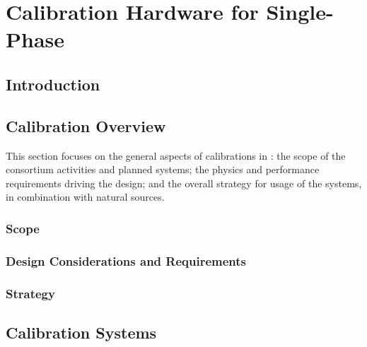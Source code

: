 

\chapter{Calibration Hardware for Single-Phase}
\label{ch:sp-calib}

\section{Introduction}
\label{sec:sp-calib-intro}



\section{Calibration Overview}
\label{sec:sp-calib-overview}

This section focuses on the general aspects of calibrations in : the scope of the consortium activities and %
planned systems; the physics and performance requirements driving the design; and the overall strategy for usage of the systems, in combination with natural sources.

\subsection{Scope}
\label{sec:sp-calib-scope}


\subsection{Design Considerations and Requirements}
\label{sec:sp-calib-requirements}


\subsection{Strategy}
\label{sec:sp-calib-strategy}



\section{Calibration Systems}
\label{sec:sp-calib-systems}


